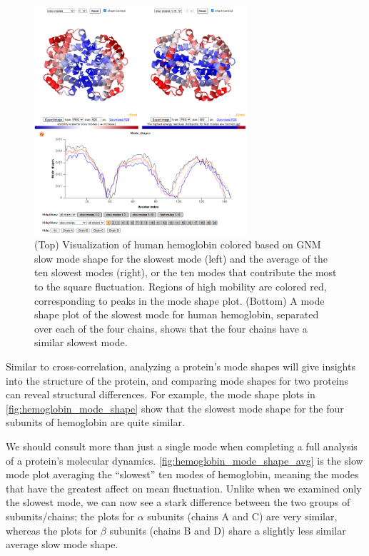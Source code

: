 \begin{figure}[h]
	\centering
	\mySfFamily
	\includegraphics[width = 0.7\textwidth]{../images/hemoglobin_mode_shape.png}
	\caption{(Top) Visualization of human hemoglobin colored based on GNM slow mode shape for the slowest mode (left) and the average of the ten slowest modes (right), or the ten modes that contribute the most to the square fluctuation. Regions of high mobility are colored red, corresponding to peaks in the mode shape plot. (Bottom) A mode shape plot of the slowest mode for human hemoglobin, separated over each of the four chains, shows that the four chains have a similar slowest mode.}
	\label{fig:hemoglobin_mode_shape}
\end{figure}

Similar to cross-correlation, analyzing a protein's mode shapes will give insights into the structure of the protein, and comparing mode shapes for two proteins can reveal structural differences. For example, the mode shape plots in \autoref{fig:hemoglobin_mode_shape} show that the slowest mode shape for the four subunits of hemoglobin are quite similar.

We should consult more than just a single mode when completing a full analysis of a protein's molecular dynamics. \autoref{fig:hemoglobin_mode_shape_avg} is the slow mode plot averaging the ``slowest'' ten modes of hemoglobin, meaning the modes that have the greatest affect on mean fluctuation. Unlike when we examined only the slowest mode, we can now see a stark difference between the two groups of subunits/chains; the plots for $\alpha$ subunits (chains A and C) are very similar, whereas the plots for $\beta$ subunits (chains B and D) share a slightly less similar average slow mode shape.\\

